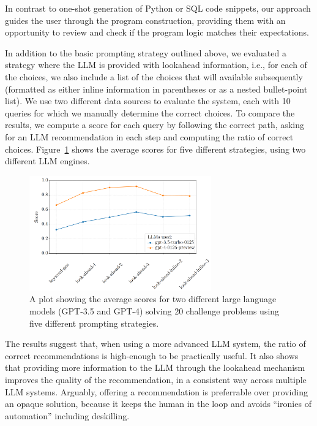 \documentclass[a4paper,UKenglish,cleveref, autoref, thm-restate]{lipics-v2021}
\begin{document}
In contrast to one-shot generation of Python or SQL code snippets, our approach guides the user
through the program construction, providing them with an opportunity to review and check if the
program logic matches their expectations.

In addition to the basic prompting strategy outlined above, we evaluated a strategy where the LLM
is provided with lookahead information, i.e., for each of the choices, we also include a list of
the choices that will available subsequently (formatted as either inline information in parentheses
or as a nested bullet-point list). We use two different data sources to evaluate the system,
each with 10 queries for which we manually determine the correct choices. To compare the results,
we compute a score for each query by following the correct path, asking for an LLM recommendation
in each step and computing the ratio of correct choices. Figure~\ref{fig:methods} shows the
average scores for five different strategies, using two different LLM engines.

\begin{figure}[t]
\includegraphics[width=0.7\textwidth]{fig/llm.png}
\caption{A plot showing the average scores for two different large language models (GPT-3.5 and GPT-4)
solving 20 challenge problems using five different prompting strategies.}
\label{fig:methods}
\end{figure}

The results suggest that, when using a more advanced LLM system, the ratio of correct
recommendations is high-enough to be practically useful. It also shows that providing more
information to the LLM through the lookahead mechanism improves the quality of the recommendation,
in a consistent way across multiple LLM systems. Arguably, offering a recommendation is preferrable
over providing an opaque solution, because it keeps the human in the loop \cite{sellen-2024-copilot}
and avoids ``ironies of automation'' \cite{bainbridge-1983-ironies} including deskilling.
\end{document}
